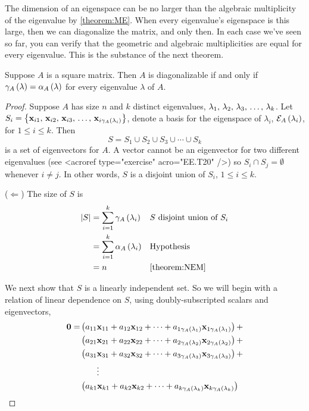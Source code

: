 \documentclass{ximera}
\begin{document}
The dimension of an eigenspace can be no larger than the algebraic
multiplicity of the eigenvalue by \ref{theorem:ME}.  When every
eigenvalue's eigenspace is this large, then we can diagonalize the
matrix, and only then.  In each case we've seen so far, you can verify
that the geometric and algebraic multiplicities are equal for every
eigenvalue.  This is the substance of the next theorem.

\begin{theorem}
\label{theorem:DMFE}

Suppose $A$ is a square matrix.  Then $A$ is diagonalizable if and only if $\gamma_{A}\left(\lambda\right)=\alpha_{A}\left(\lambda\right)$ for every eigenvalue $\lambda$ of $A$.

\begin{proof}
Suppose $A$ has size $n$ and $k$ distinct eigenvalues, ${\lambda}_{1},\,{\lambda}_{2},\,{\lambda}_{3},\,\ldots,\,{\lambda}_{k}$.  Let $S_i=\left\{\mathbf{x}_{i1},\,\mathbf{x}_{i2},\,\mathbf{x}_{i3},\,\ldots,\,\mathbf{x}_{i\gamma_{A}\left(\lambda_i\right)}\right\}$,  denote a basis for the eigenspace of $\lambda_i$, $\mathcal{E}_{A}\left(\lambda_i\right)$,  for $1\leq i\leq k$.  Then
\[
S=S_1\cup S_2\cup S_3\cup\cdots\cup S_k
\]
is a set of eigenvectors for $A$.  A vector cannot be an eigenvector for two different eigenvalues (see <acroref type="exercise" acro="EE.T20" />) so $S_i\cap S_j=\emptyset$ whenever $i\neq j$.  In other words, $S$ is a disjoint union of $S_i$, $1\leq i\leq k$.

($\Leftarrow$)  The size of $S$ is
\begin{align*}
\left\lvert S\right\rvert
&=\sum_{i=1}^k\gamma_{A}\left(\lambda_i\right)&&\text{$S$ disjoint union of $S_i$}\\
&=\sum_{i=1}^k\alpha_{A}\left(\lambda_i\right)&&\text{Hypothesis}\\
&=n&&\ref{theorem:NEM}
\end{align*}




We next show that $S$ is a linearly independent set.  So we will begin with a relation of linear dependence on $S$, using doubly-subscripted scalars and eigenvectors,
\begin{align*}
\mathbf{0}=
&\left(a_{11}\mathbf{x}_{11}+a_{12}\mathbf{x}_{12}+\cdots+a_{1\gamma_{A}\left(\lambda_1\right)}\mathbf{x}_{1\gamma_{A}\left(\lambda_1\right)}\right)+\\
&\left(a_{21}\mathbf{x}_{21}+a_{22}\mathbf{x}_{22}+\cdots+a_{2\gamma_{A}\left(\lambda_2\right)}\mathbf{x}_{2\gamma_{A}\left(\lambda_2\right)}\right)+\\
&\left(a_{31}\mathbf{x}_{31}+a_{32}\mathbf{x}_{32}+\cdots+a_{3\gamma_{A}\left(\lambda_3\right)}\mathbf{x}_{3\gamma_{A}\left(\lambda_3\right)}\right)+\\
&\quad\quad\vdots\\
&\left(a_{k1}\mathbf{x}_{k1}+a_{k2}\mathbf{x}_{k2}+\cdots+a_{k\gamma_{A}\left(\lambda_k\right)}\mathbf{x}_{k\gamma_{A}\left(\lambda_k\right)}\right)
\end{align*}





\end{proof}
\end{theorem}
\end{document}
